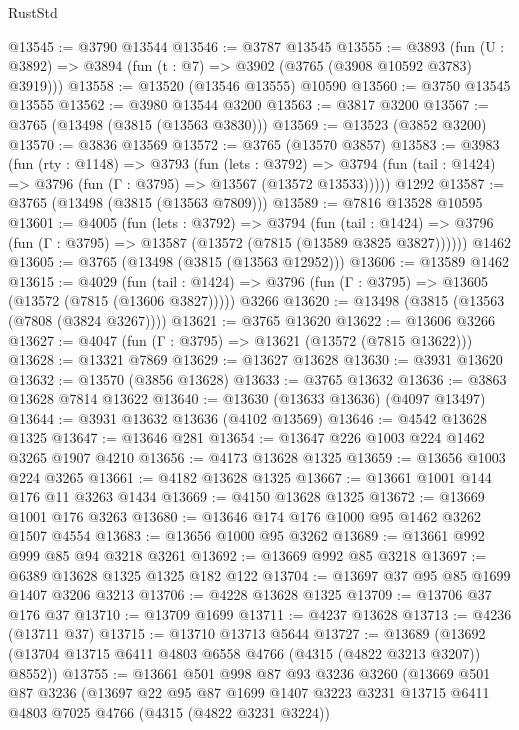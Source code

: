 \begin{lexlean}{RustStd}
\begin{coremodule}
@13545 := @3790 @13544
@13546 := @3787 @13545
@13555 := @3893
    (fun (U : @3892) => @3894 (fun (t : @7) => @3902 (@3765 (@3908 @10592 @3783) @3919)))
@13558 := @13520 (@13546 @13555) @10590
@13560 := @3750 @13545 @13555
@13562 := @3980 @13544 @3200
@13563 := @3817 @3200
@13567 := @3765 (@13498 (@3815 (@13563 @3830)))
@13569 := @13523 (@3852 @3200)
@13570 := @3836 @13569
@13572 := @3765 (@13570 @3857)
@13583 := @3983
    (fun (rty : @1148) =>
    @3793
      (fun (lets : @3792) =>
      @3794 (fun (tail : @1424) => @3796 (fun (Γ : @3795) => @13567 (@13572 @13533)))))
    @1292
@13587 := @3765 (@13498 (@3815 (@13563 @7809)))
@13589 := @7816 @13528 @10595
@13601 := @4005
    (fun (lets : @3792) =>
    @3794
      (fun (tail : @1424) =>
      @3796 (fun (Γ : @3795) => @13587 (@13572 (@7815 (@13589 @3825 @3827))))))
    @1462
@13605 := @3765 (@13498 (@3815 (@13563 @12952)))
@13606 := @13589 @1462
@13615 := @4029
    (fun (tail : @1424) => @3796 (fun (Γ : @3795) => @13605 (@13572 (@7815 (@13606 @3827)))))
    @3266
@13620 := @13498 (@3815 (@13563 (@7808 (@3824 @3267))))
@13621 := @3765 @13620
@13622 := @13606 @3266
@13627 := @4047 (fun (Γ : @3795) => @13621 (@13572 (@7815 @13622)))
@13628 := @13321 @7869
@13629 := @13627 @13628
@13630 := @3931 @13620
@13632 := @13570 (@3856 @13628)
@13633 := @3765 @13632
@13636 := @3863 @13628 @7814 @13622
@13640 := @13630 (@13633 @13636) (@4097 @13497)
@13644 := @3931 @13632 @13636 (@4102 @13569)
@13646 := @4542 @13628 @1325
@13647 := @13646 @281
@13654 := @13647 @226 @1003 @224 @1462 @3265 @1907 @4210
@13656 := @4173 @13628 @1325
@13659 := @13656 @1003 @224 @3265
@13661 := @4182 @13628 @1325
@13667 := @13661 @1001 @144 @176 @11 @3263 @1434
@13669 := @4150 @13628 @1325
@13672 := @13669 @1001 @176 @3263
@13680 := @13646 @174 @176 @1000 @95 @1462 @3262 @1507 @4554
@13683 := @13656 @1000 @95 @3262
@13689 := @13661 @992 @999 @85 @94 @3218 @3261
@13692 := @13669 @992 @85 @3218
@13697 := @6389 @13628 @1325 @1325 @182 @122
@13704 := @13697 @37 @95 @85 @1699 @1407 @3206 @3213
@13706 := @4228 @13628 @1325
@13709 := @13706 @37 @176 @37
@13710 := @13709 @1699
@13711 := @4237 @13628
@13713 := @4236 (@13711 @37)
@13715 := @13710 @13713 @5644
@13727 := @13689 (@13692 (@13704 @13715 @6411 @4803 @6558 @4766 (@4315 (@4822 @3213 @3207)) @8552))
@13755 := @13661
    @501
    @998
    @87
    @93
    @3236
    @3260
    (@13669
      @501
      @87
      @3236
      (@13697
        @22
        @95
        @87
        @1699
        @1407
        @3223
        @3231
        @13715
        @6411
        @4803
        @7025
        @4766
        (@4315 (@4822 @3231 @3224))

\end{coremodule}
\end{lexlean}
